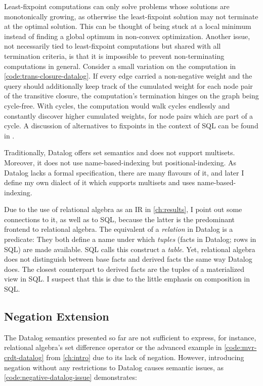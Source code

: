 Least-fixpoint computations can only solve problems whose solutions
are monotonically growing, as otherwise the least-fixpoint solution may not
terminate at the optimal solution.
This can be thought of being stuck at a local minimum instead of finding
a global optimum in non-convex optimization.
Another issue, not necessarily tied to least-fixpoint computations but shared
with all termination criteria, is that it is impossible to prevent
non-terminating computations in general.
Consider a small variation on the computation in \ref{code:trans-closure-datalog}.
If every edge carried a non-negative weight and the query should additionally
keep track of the cumulated weight for each node pair of the transitive closure,
the computation's termination hinges on the graph being cycle-free.
With cycles, the computation would walk cycles endlessly and constantly discover
higher cumulated weights, for node pairs which are part of a cycle.
A discussion of alternatives to fixpoints in the context of SQL
can be found in \cite{hirn2023fix}.

Traditionally, Datalog offers set semantics and does not support multisets.
Moreover, it does not use name-based-indexing but positional-indexing.
As Datalog lacks a formal specification, there are many flavours of it,
and later I define my own dialect of it which supports multisets and
uses name-based-indexing.

Due to the use of relational algebra as an \ac{IR} in \ref{ch:results},
I point out some connections to it, as well as to SQL,
because the latter is the predominant frontend to relational algebra.
The equivalent of a \emph{relation} in Datalog is a predicate:
They both define a name under which \emph{tuples} (facts in Datalog; rows in SQL)
are made available. SQL calls this construct a \emph{table}.
Yet, relational algebra does not distinguish between base facts and derived facts
the same way Datalog does.
The closest counterpart to derived facts are the tuples of a materialized view
in SQL.
I suspect that this is due to the little emphasis on composition in SQL.

\subsection{Negation Extension}\label{sec:datalog-negation}

The Datalog semantics presented so far are not sufficient to express,
for instance, relational algebra's set difference operator or the advanced example
in \ref{code:mvr-crdt-datalog} from \ref{ch:intro} due to its lack of negation.
However, introducing negation without any restrictions to Datalog causes
semantic issues, as \ref{code:negative-datalog-issue} demonstrates:


